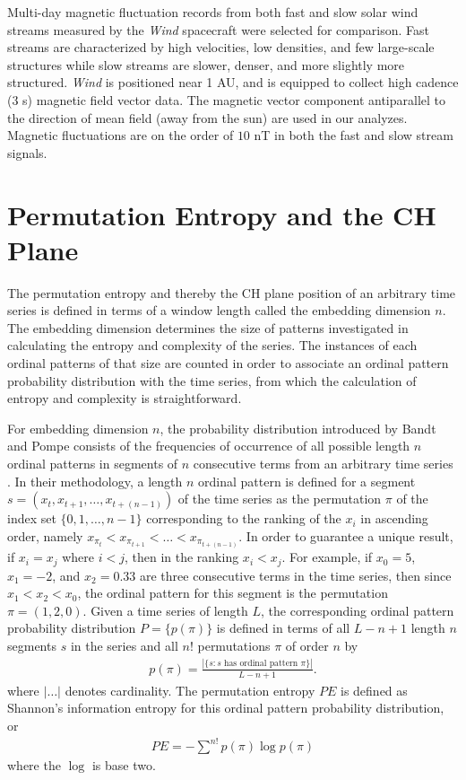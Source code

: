 \documentclass[aps,pre,twocolumn,secnumarabic,nobalancelastpage,amsmath,amssymb,
nofootinbib]{revtex4-1}
\begin{document}
 Multi-day magnetic fluctuation records from both fast and slow solar wind streams measured by the \textit{Wind} spacecraft were selected for comparison. Fast streams are characterized by high velocities, low densities, and  few large-scale structures while slow streams are slower, denser, and more slightly more structured. \textit{Wind} is positioned near 1 AU, and is equipped to collect high cadence (3 s) magnetic field vector data.   The magnetic vector component antiparallel to the direction of mean field (away from the sun) are used in our analyzes. Magnetic fluctuations are on the order of $10$ nT in both the fast and slow stream signals. 


\section{Permutation Entropy and the CH Plane}
The permutation entropy and thereby the CH plane position of an arbitrary time series is defined in terms of a window length called the embedding dimension $n$. The embedding dimension determines the size of patterns investigated in calculating the entropy and complexity of the series. The instances of each ordinal patterns of that size are counted in order to associate an ordinal pattern probability distribution with the time series, from which the calculation of entropy and complexity is straightforward.

For embedding dimension $n$, the probability distribution introduced by Bandt and Pompe consists of the frequencies of occurrence of all possible length $n$ ordinal patterns in segments of $n$ consecutive terms from an arbitrary time series \cite{bandt2002}. In their methodology, a length $n$ ordinal pattern is defined for a segment $s = ( x_t,x_{t+1},\ldots,x_{t+(n-1)} )$ of the time series as the permutation $\pi$ of the index set $\{0,1,\ldots,n-1 \}$ corresponding to the ranking of the $x_i$ in ascending order, namely $x_{\pi_t}< x_{\pi_{t+1}}<\ldots< x_{\pi_{t+(n-1)}}$. In order to guarantee a unique result, if $x_i = x_j$ where $i<j$, then in the ranking $x_i <x_j$. For example, if $x_0 = 5$,  $x_1= -2$,  and $x_2 = 0.33$ are three consecutive terms in the time series, then since $x_1 < x_2 < x_0$, the ordinal pattern for this segment is the permutation $\pi = (1,2,0)$.  Given a time series of length $L$, the corresponding ordinal pattern probability distribution $P= \{p(\pi) \}$ is defined in terms of all $L-n+1$ length $n$ segments $s$ in the series and all $n!$ permutations $\pi$ of order $n$ by
\begin{align}
p(\pi) = \frac{|\{s: \text{$s$ has ordinal pattern $\pi$}\}| }{L-n+1}. 
\end{align}
where $|\ldots|$ denotes cardinality. The permutation entropy $PE$ is defined as Shannon's information entropy for this ordinal pattern probability distribution, or
\begin{align}
PE  = -\sum^{n!} p(\pi) \log p(\pi)
\end{align}
where the $\log$ is base two.
\end{document}

